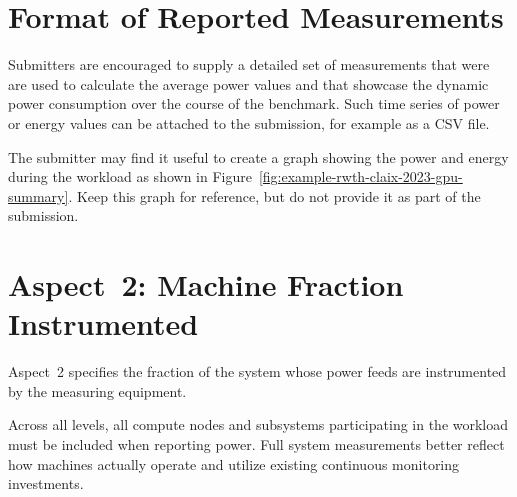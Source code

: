 \section{Format of Reported Measurements}
\label{sec:FoRM}

Submitters are encouraged to supply a detailed set of measurements that were are used to calculate the average power values and that showcase the dynamic power consumption over the course of the benchmark.
Such time series of power or energy values can be attached to the submission, for example as a CSV file.

The submitter may find it useful to create a graph showing the power and energy during the workload as shown in Figure~\ref{fig:example-rwth-claix-2023-gpu-summary}.
Keep this graph for reference, but do not provide it as part of the submission.

\section{Aspect~2: Machine Fraction Instrumented}
\label{sec:A2MFI}

Aspect~2 specifies the fraction of the system whose power feeds are instrumented by the measuring equipment.

Across all levels, all compute nodes and subsystems participating in the workload must be included when reporting power.
Full system measurements better reflect how machines actually operate and utilize existing continuous monitoring investments.



